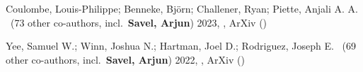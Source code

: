 \item[{\color{numcolor}\scriptsize2}] Coulombe, Louis-Philippe; Benneke, Bj{\"o}rn; Challener, Ryan; Piette, Anjali A. A. \etal\ ({73} other co-authors, incl.\ \textbf{Savel, Arjun}) 2023, , ArXiv ()

\item[{\color{numcolor}\scriptsize1}] Yee, Samuel W.; Winn, Joshua N.; Hartman, Joel D.; Rodriguez, Joseph E. \etal\ ({69} other co-authors, incl.\ \textbf{Savel, Arjun}) 2022, , ArXiv ()